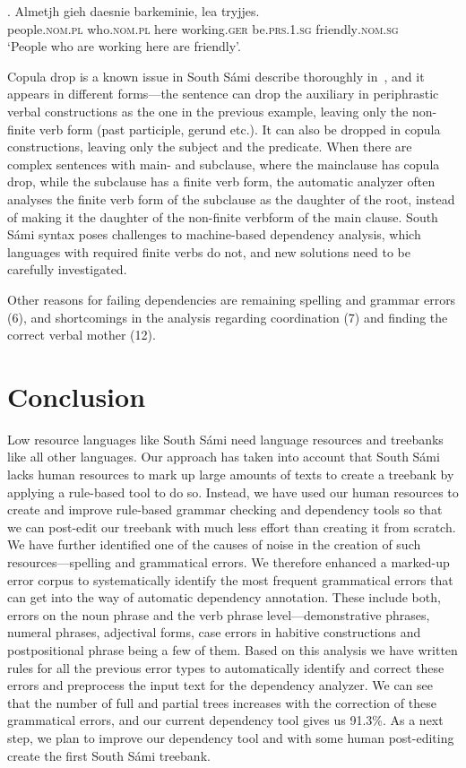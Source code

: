 \documentclass[free]{flammie}
\begin{document}
\exg. Almetjh gieh daesnie barkeminie, lea tryjjes.\label{almetjh}\\
people\textsc{.nom.pl} who\textsc{.nom.pl} here working\textsc{.ger}
be\textsc{.prs.1.sg} friendly\textsc{.nom.sg}\\
`People who are working here are friendly'.

Copula drop is a known issue in South Sámi describe thoroughly
in~\cite{ylikoski2022south}, and it appears in different forms---the sentence
can drop the auxiliary in periphrastic verbal constructions as the one in the
previous example, leaving only the non-finite verb form (past participle, gerund
etc.).  It can also be dropped in copula constructions, leaving only the subject
and the predicate. When there are complex sentences with main- and subclause,
where the mainclause has copula drop, while the subclause has a finite verb
form, the automatic analyzer often analyses the finite verb form of the
subclause as the daughter of the root, instead of making it the daughter of the
non-finite verbform of the main clause. South Sámi syntax poses challenges to
machine-based dependency analysis, which languages with required finite verbs do
not, and new solutions need to be carefully investigated.

Other reasons for failing dependencies are remaining spelling and grammar errors
(6), and shortcomings in the analysis regarding coordination (7) and finding the
correct verbal mother (12).
\section{Conclusion}

Low resource languages like South Sámi need language resources and treebanks
like all other languages. Our approach has taken into account that South Sámi
lacks human resources to mark up large amounts of texts to create a treebank by
applying a rule-based tool to do so. Instead, we have used our human resources
to create and improve rule-based grammar checking and dependency tools so that
we can post-edit our treebank with much less effort than creating it from
scratch. We have further identified one of the causes of noise in the creation
of such resources---spelling and grammatical errors. We therefore enhanced a
marked-up error corpus to systematically identify the most frequent grammatical
errors that can get into the way of automatic dependency annotation. These
include both, errors on the noun phrase and the verb phrase
level---demonstrative phrases, numeral phrases, adjectival forms, case errors in
habitive constructions and postpositional phrase being a few of them. Based on
this analysis we have written rules for all the previous error types to
automatically identify and correct these errors and preprocess the input text
for the dependency analyzer.  We can see that the number of full and partial
trees increases with the correction of these grammatical errors, and our current
dependency tool gives us 91.3\%.  As a next step, we plan to improve our
dependency tool and with some human post-editing create the first South Sámi
treebank.
\end{document}
